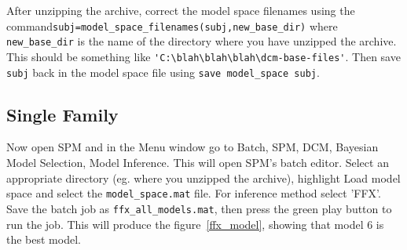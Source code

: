 After unzipping the archive, correct the model space filenames using the 
command\newline \verb!subj=model_space_filenames(subj,new_base_dir)! where \verb!new_base_dir! is the name of the directory where you have unzipped the archive. This should be something like \newline \verb!'C:\blah\blah\blah\dcm-base-files'!. Then save \verb!subj! back in the model space file using \verb!save model_space subj!.

\subsection{Single Family}

Now open SPM and in the Menu window go to Batch, SPM, DCM, Bayesian Model Selection, Model Inference. This will open SPM's batch editor. Select an appropriate directory (eg. where you unzipped the archive), highlight Load model space and select the \verb!model_space.mat! file.
For inference method select 'FFX'. Save the batch job as \verb!ffx_all_models.mat!, then press the green play button to run the job.
This will produce the figure~\ref{ffx_model}, showing that model 6 is the best model.

